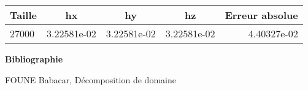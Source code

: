\documentclass[a4paper,12pt,twoside]{report}
\begin{document}
\begin{tabular}{|l|c|c|c|r|}
  \hline
  Taille  & hx & hy  & hz & Erreur absolue \\
  \hline
  27000 & 3.22581e-02   & 3.22581e-02& 3.22581e-02&4.40327e-02  \\
  \hline
\end{tabular}

\cleardoublepage





  




\textbf{Bibliographie}

FOUNE Babacar, Décomposition de domaine
\end{document}
